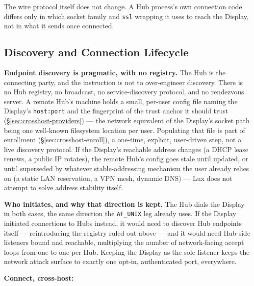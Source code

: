 \documentclass[a4paper,10pt]{article}
\newcommand{\field}[1]{\texttt{#1}}
\begin{document}
The wire protocol itself does not change.  A Hub process's own connection
code differs only in which socket family and \field{ssl} wrapping it uses
to reach the Display, not in what it sends once connected.

\subsection{Discovery and Connection Lifecycle}

\textbf{Endpoint discovery is pragmatic, with no registry.}  The Hub is
the connecting party, and the instruction is not to over-engineer
discovery.  There is no Hub registry, no broadcast, no service-discovery
protocol, and no rendezvous server.  A remote Hub's machine holds a small,
per-user config file naming the Display's \field{host:port} and the
fingerprint of the trust anchor it should trust
(\S\ref{sec:crosshost-providers}) --- the network equivalent of the
Display's socket path being one well-known filesystem location per user.
Populating that file is part of enrollment (\S\ref{sec:crosshost-enroll}),
a one-time, explicit, user-driven step, not a live discovery protocol.  If
the Display's reachable address changes (a DHCP lease renews, a public IP
rotates), the remote Hub's config goes stale until updated, or until
superseded by whatever stable-addressing mechanism the user already relies
on (a static LAN reservation, a VPN mesh, dynamic DNS) --- Lux does not
attempt to solve address stability itself.

\textbf{Who initiates, and why that direction is kept.}  The Hub dials the
Display in both cases, the same direction the \field{AF\_UNIX} leg already
uses.  If the Display initiated connections to Hubs instead, it would need
to discover Hub endpoints itself --- reintroducing the registry ruled out
above --- and it would need Hub-side listeners bound and reachable,
multiplying the number of network-facing accept loops from one to one per
Hub.  Keeping the Display as the sole listener keeps the network attack
surface to exactly one opt-in, authenticated port, everywhere.

\textbf{Connect, cross-host:}
\end{document}

